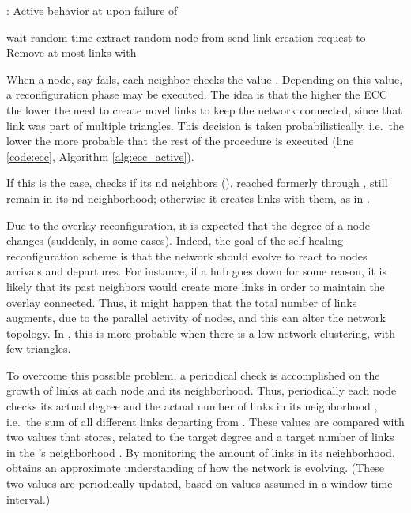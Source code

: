 \documentclass[10pt, conference, compsocconf]{IEEEtran}
\begin{document}
\begin{algorithm}[thbp]
\caption{: Active behavior at  upon failure of }
\label{alg:ecc_active}
\begin{algorithmic}[1]
\State 
\Statex
{}\label{code:ecc}
 \While {(}
  \State wait random time 
  \State  extract random node from  
    \State send link creation request to 
 \EndWhile
\EndIf
\Statex 
\Require 
\State Remove at most  links with 
\end{algorithmic}
\end{algorithm}

When a node, say  fails, each neighbor  checks the value .
Depending on this value, a reconfiguration phase may be executed. The idea is that the higher the ECC the lower the need to create novel links to keep the network connected, since that link was part of multiple triangles. This decision is taken probabilistically, i.e.~the lower  the more probable that the rest of the procedure is executed (line \ref{code:ecc}, Algorithm \ref{alg:ecc_active}).

If this is the case,  checks if its nd neighbors (), reached formerly through , still remain in its nd neighborhood; otherwise it creates links with them, as in . 

Due to the overlay reconfiguration, it is expected that the degree of a node changes (suddenly, in some cases). Indeed, the goal of the self-healing reconfiguration scheme is that the network should evolve to react to nodes arrivals and departures. For instance, if a hub goes down for some reason, it is likely that its past neighbors would create more links in order to maintain the overlay connected.
Thus, it might happen that the total number of links augments, due to the parallel activity of nodes, and this can alter the network topology. In , this is more probable when there is a low network clustering, with few triangles.  

To overcome this possible problem, a periodical check is accomplished on the growth of links at each node and its neighborhood. 
Thus, periodically each node  checks its actual degree  and the actual number of links in its neighborhood , i.e.~the sum of all different links departing from .
These values are compared with two values that  stores, related to the target degree  and a target number of links in the 's neighborhood .
By monitoring the amount of links in its neighborhood,  obtains an approximate understanding of how the network is evolving.
(These two values are periodically updated, based on values assumed in a window time interval.)
\end{document}

